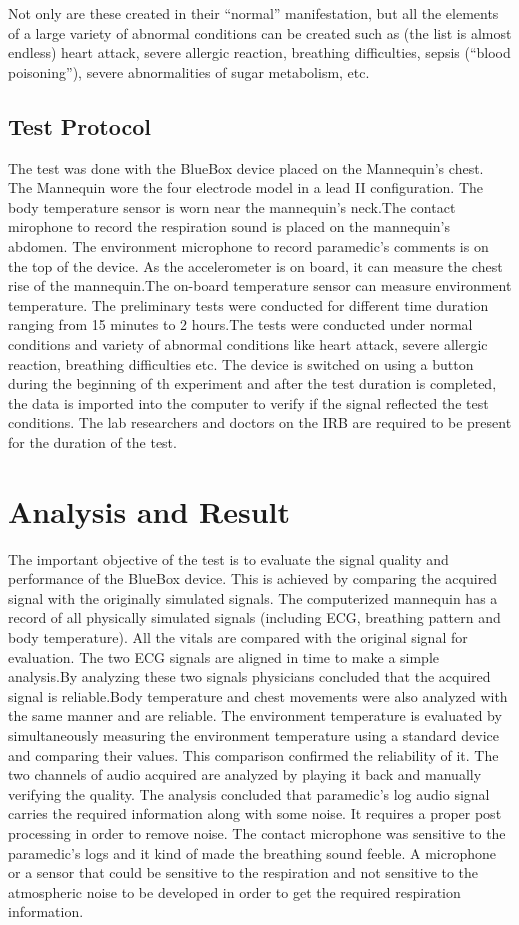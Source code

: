 Not only are these created in their “normal” manifestation, but all the elements of a large variety of abnormal conditions can be created such as (the list is almost endless) heart attack, severe allergic reaction, breathing difficulties, sepsis (“blood poisoning”), severe abnormalities of sugar metabolism, etc.

\subsection{Test Protocol}
The test was done with the BlueBox device placed on the Mannequin's chest. The Mannequin wore the four electrode model in a lead II configuration. The body temperature sensor is worn near the mannequin's neck.The contact mirophone to record the respiration sound is placed on the mannequin's abdomen. The environment microphone to record paramedic's comments is on the top of the device. As the accelerometer is on board, it can measure the chest rise of the mannequin.The on-board temperature sensor can measure environment temperature.  The preliminary tests were conducted for different time duration ranging from 15 minutes to 2 hours.The tests were conducted under normal conditions and variety of abnormal conditions like heart attack, severe allergic reaction, breathing difficulties etc. The device is switched on using a button during the beginning of th experiment and after the test duration is completed, the data is imported into the computer to verify if the signal reflected the test conditions. The lab researchers and doctors on the IRB are required to be present for the duration of the test. 

\section{Analysis and Result}
The important objective of the test is to evaluate the signal quality and performance of the BlueBox device. This is achieved by comparing the acquired signal with the originally simulated signals. The computerized mannequin has a record of all physically simulated signals (including ECG, breathing pattern and body temperature). All the vitals are compared with the original signal for evaluation. The two ECG signals are aligned in time to make a simple analysis.By analyzing these two signals physicians concluded that the acquired signal is reliable.Body temperature and chest movements were also analyzed with the same manner and are reliable. 
The environment temperature is evaluated by simultaneously measuring the environment temperature using a standard device and comparing their values. This comparison confirmed the reliability of it. 
The two channels of audio acquired are analyzed by playing it back and manually verifying the quality. The analysis concluded that paramedic's log audio signal carries the required information along with some noise. It requires a proper post processing in order to remove noise. The contact microphone was sensitive to the paramedic's logs and it kind of made the breathing sound feeble. A microphone or a sensor that could be sensitive to the respiration and not sensitive to the atmospheric noise to be developed in order to get the required respiration information.
